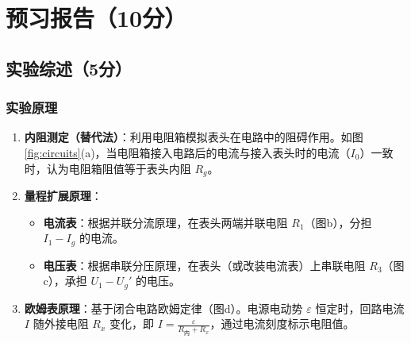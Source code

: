 \documentclass{../../templates/Report}%
\begin{document}
\maketitle%

\section{预习报告（10分）}
\subsection{实验综述（5分）}
\subsubsection{实验原理}
\begin{enumerate}
    \item \textbf{内阻测定（替代法）}：利用电阻箱模拟表头在电路中的阻碍作用。如图\ref{fig:circuits}(a)，当电阻箱接入电路后的电流与接入表头时的电流（$I_0$）一致时，认为电阻箱阻值等于表头内阻 $R_g$。
    \item \textbf{量程扩展原理}：
          \begin{itemize}
              \item \textbf{电流表}：根据并联分流原理，在表头两端并联电阻 $R_1$（图b），分担 $I_1 - I_g$ 的电流。
              \item \textbf{电压表}：根据串联分压原理，在表头（或改装电流表）上串联电阻 $R_3$（图c），承担 $U_1 - U_g'$ 的电压。
          \end{itemize}
    \item \textbf{欧姆表原理}：基于闭合电路欧姆定律（图d）。电源电动势 $\varepsilon$ 恒定时，回路电流 $I$ 随外接电阻 $R_x$ 变化，即 $I = \frac{\varepsilon}{R_{\text{内}} + R_x}$，通过电流刻度标示电阻值。
\end{enumerate}
\end{document}
